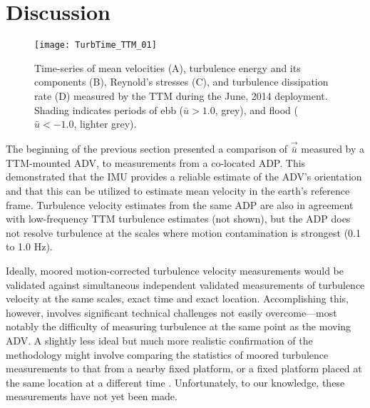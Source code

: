 
\section{Discussion}
\label{sec:discussion}

\begin{figure*}[t]
  \centering
  \texttt{[image: TurbTime\_TTM\_01]}
  \caption{Time-series of mean velocities (A), turbulence energy and its components (B), Reynold's stresses (C), and turbulence dissipation rate (D) measured by the TTM during the June, 2014 deployment. Shading indicates periods of ebb ($\bar{u}>1.0$, grey), and flood ($\bar{u}<-1.0$, lighter grey).}
  \label{fig:turbtime:ttm}
\end{figure*}

The beginning of the previous section presented a comparison of $\vec{\bar{u}}$ measured by a TTM-mounted ADV, to measurements from a co-located ADP. This demonstrated that the IMU provides a reliable estimate of the ADV's orientation and that this can be utilized to estimate mean velocity in the earth's reference frame. Turbulence velocity estimates from the same ADP are also in agreement with low-frequency TTM turbulence estimates (not shown), but the ADP does not resolve turbulence at the scales where motion contamination is strongest (0.1 to 1.0 Hz).

Ideally, moored motion-corrected turbulence velocity measurements would be validated against simultaneous independent validated measurements of turbulence velocity at the same scales, exact time and exact location. Accomplishing this, however, involves significant technical challenges not easily overcome---most notably the difficulty of measuring turbulence at the same point as the moving ADV. A slightly less ideal but much more realistic confirmation of the methodology might involve comparing the statistics of moored turbulence measurements to that from a nearby fixed platform, or a fixed platform placed at the same location at a different time \cite[e.g. the `TTT' platform described in][]{Thomson++2012}. Unfortunately, to our knowledge, these measurements have not yet been made.


